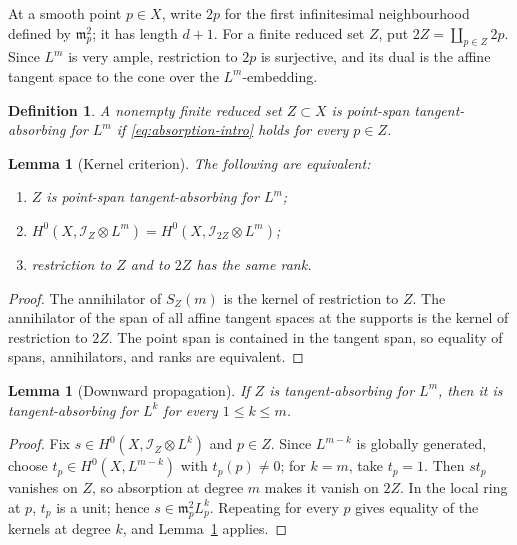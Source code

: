 \documentclass[11pt]{article}
\newtheorem{lemma}[theorem]{Lemma}
\newtheorem{definition}[theorem]{Definition}
\newcommand{\cI}{\mathcal I}
\begin{document}
At a smooth point $p\in X$, write $2p$ for the first infinitesimal
neighbourhood defined by $\mathfrak m_p^2$; it has length $d+1$.  For a
finite reduced set $Z$, put $2Z=\coprod_{p\in Z}2p$.  Since $L^m$ is very
ample, restriction to $2p$ is surjective, and its dual is the affine tangent
space to the cone over the $L^m$-embedding.

\begin{definition}
A nonempty finite reduced set $Z\subset X$ is \emph{point-span
tangent-absorbing for $L^m$} if \eqref{eq:absorption-intro} holds for every
$p\in Z$.
\end{definition}

\begin{lemma}[Kernel criterion]\label{lem:kernel}
The following are equivalent:
\begin{enumerate}[label=(\roman*)]
\item $Z$ is point-span tangent-absorbing for $L^m$;
\item $H^0(X,\cI_Z\otimes L^m)=H^0(X,\cI_{2Z}\otimes L^m)$;
\item restriction to $Z$ and to $2Z$ has the same rank.
\end{enumerate}
\end{lemma}

\begin{proof}
The annihilator of $S_Z(m)$ is the kernel of restriction to $Z$.  The
annihilator of the span of all affine tangent spaces at the supports is the
kernel of restriction to $2Z$.  The point span is contained in the tangent
span, so equality of spans, annihilators, and ranks are equivalent.
\end{proof}

\begin{lemma}[Downward propagation]\label{lem:downward}
If $Z$ is tangent-absorbing for $L^m$, then it is tangent-absorbing for $L^k$
for every $1\leq k\leq m$.
\end{lemma}

\begin{proof}
Fix $s\in H^0(X,\cI_Z\otimes L^k)$ and $p\in Z$.  Since $L^{m-k}$ is
globally generated, choose $t_p\in H^0(X,L^{m-k})$ with $t_p(p)\neq0$; for
$k=m$, take $t_p=1$.  Then $st_p$ vanishes on $Z$, so absorption at degree
$m$ makes it vanish on $2Z$.  In the local ring at $p$, $t_p$ is a unit;
hence $s\in\mathfrak m_p^2L^k_p$.  Repeating for every $p$ gives equality of
the kernels at degree $k$, and Lemma~\ref{lem:kernel} applies.
\end{proof}
\end{document}
